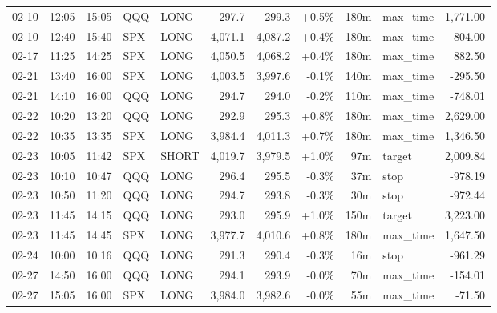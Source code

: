 \documentclass[11pt,a4paper,twoside]{article}
\begin{document}
\begin{center}
\begin{longtable}{>{\color{txtmain}}l l l l l r r r r >{\color{txtmain}}l r}
02-10 & 12:05 & 15:05 & QQQ & LONG & 297.7 & 299.3 & \textcolor{wingreen}{+0.5\%} & 180m & max\_time & \textcolor{wingreen}{1,771.00} \\
02-10 & 12:40 & 15:40 & SPX & LONG & 4,071.1 & 4,087.2 & \textcolor{wingreen}{+0.4\%} & 180m & max\_time & \textcolor{wingreen}{804.00} \\
02-17 & 11:25 & 14:25 & SPX & LONG & 4,050.5 & 4,068.2 & \textcolor{wingreen}{+0.4\%} & 180m & max\_time & \textcolor{wingreen}{882.50} \\
02-21 & 13:40 & 16:00 & SPX & LONG & 4,003.5 & 3,997.6 & \textcolor{lossred}{-0.1\%} & 140m & max\_time & \textcolor{lossred}{-295.50} \\
02-21 & 14:10 & 16:00 & QQQ & LONG & 294.7 & 294.0 & \textcolor{lossred}{-0.2\%} & 110m & max\_time & \textcolor{lossred}{-748.01} \\
02-22 & 10:20 & 13:20 & QQQ & LONG & 292.9 & 295.3 & \textcolor{wingreen}{+0.8\%} & 180m & max\_time & \textcolor{wingreen}{2,629.00} \\
02-22 & 10:35 & 13:35 & SPX & LONG & 3,984.4 & 4,011.3 & \textcolor{wingreen}{+0.7\%} & 180m & max\_time & \textcolor{wingreen}{1,346.50} \\
02-23 & 10:05 & 11:42 & SPX & SHORT & 4,019.7 & 3,979.5 & \textcolor{wingreen}{+1.0\%} & 97m & target & \textcolor{wingreen}{2,009.84} \\
02-23 & 10:10 & 10:47 & QQQ & LONG & 296.4 & 295.5 & \textcolor{lossred}{-0.3\%} & 37m & stop & \textcolor{lossred}{-978.19} \\
02-23 & 10:50 & 11:20 & QQQ & LONG & 294.7 & 293.8 & \textcolor{lossred}{-0.3\%} & 30m & stop & \textcolor{lossred}{-972.44} \\
02-23 & 11:45 & 14:15 & QQQ & LONG & 293.0 & 295.9 & \textcolor{wingreen}{+1.0\%} & 150m & target & \textcolor{wingreen}{3,223.00} \\
02-23 & 11:45 & 14:45 & SPX & LONG & 3,977.7 & 4,010.6 & \textcolor{wingreen}{+0.8\%} & 180m & max\_time & \textcolor{wingreen}{1,647.50} \\
02-24 & 10:00 & 10:16 & QQQ & LONG & 291.3 & 290.4 & \textcolor{lossred}{-0.3\%} & 16m & stop & \textcolor{lossred}{-961.29} \\
02-27 & 14:50 & 16:00 & QQQ & LONG & 294.1 & 293.9 & \textcolor{lossred}{-0.0\%} & 70m & max\_time & \textcolor{lossred}{-154.01} \\
02-27 & 15:05 & 16:00 & SPX & LONG & 3,984.0 & 3,982.6 & \textcolor{lossred}{-0.0\%} & 55m & max\_time & \textcolor{lossred}{-71.50} \\

\end{longtable}
\end{center}
\end{document}
